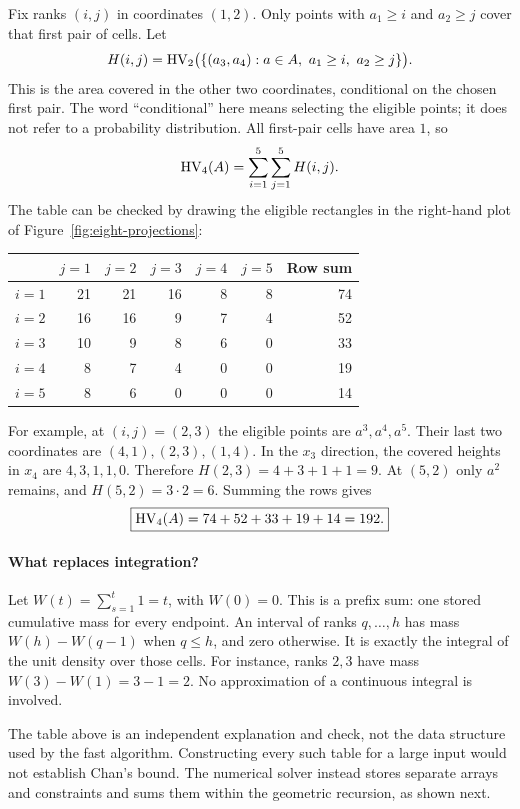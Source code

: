 Fix ranks $(i,j)$ in coordinates $(1,2)$. Only points with
$a_1\ge i$ and $a_2\ge j$ cover that first pair of cells. Let
\[
 H(i,j)=\HV_2\bigl(\{(a_3,a_4):a\in A,\ a_1\ge i,\ a_2\ge j\}\bigr).
\]
This is the area covered in the other two coordinates, conditional on
the chosen first pair. The word ``conditional'' here means selecting
the eligible points; it does not refer to a probability distribution.
All first-pair cells have area $1$, so
\[
                    \operatorname{HV}_4(A)=\sum_{i=1}^5\sum_{j=1}^5 H(i,j).
\]
The table can be checked by drawing the eligible rectangles in the
right-hand plot of Figure~\ref{fig:eight-projections}:
\begin{center}
\begin{tabular}{@{}c|rrrrr|r@{}}
\toprule
 & $j=1$&$j=2$&$j=3$&$j=4$&$j=5$&Row sum\\\midrule
$i=1$&21&21&16&8&8&74\\
$i=2$&16&16&9&7&4&52\\
$i=3$&10&9&8&6&0&33\\
$i=4$&8&7&4&0&0&19\\
$i=5$&8&6&0&0&0&14\\\bottomrule
\end{tabular}
\end{center}
For example, at $(i,j)=(2,3)$ the eligible points are $a^3,a^4,a^5$.
Their last two coordinates are $(4,1),(2,3),(1,4)$.
In the $x_3$ direction, the covered heights in $x_4$ are $4,3,1,1,0$.
Therefore $H(2,3)=4+3+1+1=9$. At $(5,2)$ only $a^2$ remains, and
$H(5,2)=3\cdot2=6$. Summing the rows gives
\[
               \boxed{\operatorname{HV}_4(A)=74+52+33+19+14=192.}
\]

\paragraph{What replaces integration?}
Let $W(t)=\sum_{s=1}^t1=t$, with $W(0)=0$. This is a prefix sum:
one stored cumulative mass for every endpoint. An interval of ranks
$q,\ldots,h$ has mass $W(h)-W(q-1)$ when $q\le h$, and zero otherwise.
It is exactly the integral of the unit density over those cells.
For instance, ranks $2,3$ have mass $W(3)-W(1)=3-1=2$.
No approximation of a continuous integral is involved.

The table above is an independent explanation and check, not the
data structure used by the fast algorithm. Constructing every such
table for a large input would not establish Chan's bound. The numerical
solver instead stores separate arrays and constraints and sums them
within the geometric recursion, as shown next.

